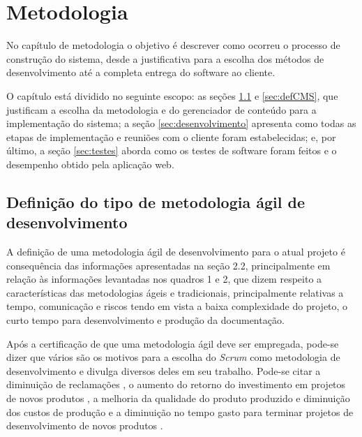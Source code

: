 \chapter{Metodologia}
\label{ch:metodologia}

\hspace{2.5cm}

No capítulo de metodologia o objetivo é descrever como ocorreu o processo de construção do sistema, desde a justificativa para a escolha dos métodos de desenvolvimento até a completa entrega do software ao cliente. 

O capítulo está dividido no seguinte escopo: as seções \ref{sec:defMetodologia} e \ref{sec:defCMS}, que justificam a escolha da metodologia e do gerenciador de conteúdo para a implementação do sistema; a seção \ref{sec:desenvolvimento} apresenta como todas as etapas de implementação e reuniões com o cliente foram estabelecidas; e, por último, a seção \ref{sec:testes} aborda como os testes de software foram feitos e o desempenho obtido pela aplicação web.

\hspace{2.5cm}

\section{Definição do tipo de metodologia ágil de desenvolvimento}
\label{sec:defMetodologia}

\hspace{2.5cm}

A definição de uma metodologia ágil de desenvolvimento para o atual projeto é consequência das informações apresentadas na seção 2.2, principalmente em relação às informações levantadas nos quadros 1 e 2, que dizem respeito a características das metodologias ágeis e tradicionais, principalmente relativas a tempo, comunicação e riscos tendo em vista a baixa complexidade do projeto, o curto tempo para desenvolvimento e produção da documentação.

Após a certificação de que uma metodologia ágil deve ser empregada, pode-se dizer que vários são os motivos para a escolha do \textit{Scrum} como metodologia de desenvolvimento e  divulga diversos deles em seu trabalho. Pode-se citar a diminuição de reclamações , o aumento do retorno do investimento em projetos de novos produtos , a melhoria da qualidade do produto produzido e diminuição dos custos de produção  e a diminuição no tempo gasto para terminar projetos de desenvolvimento de novos produtos .


